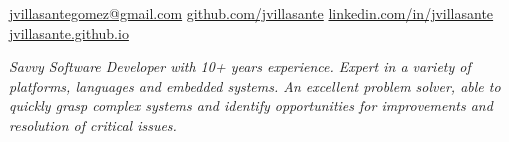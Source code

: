 \documentclass[10pt,a4paper]{article}
\begin{document}
\sloppy  %


\nobreakvspace{0.3em}  %

\noindent\href{mailto:jvillasantegomez.at.gmail.dot.com}{jvillasantegomez\mbox{}@\mbox{}gmail.com}\sbull
\noindent\href{https://github.com/jvillasante}{github.com/jvillasante}\sbull
\noindent\href{https://linkedin.com/in/jvillasante}{linkedin.com/in/jvillasante}\sbull
\noindent\href{https://jvillasante.github.io}{jvillasante.github.io}
\\

\emph{Savvy Software Developer with 10+ years experience. Expert in a variety of platforms, languages and embedded systems. An excellent problem solver, able to quickly grasp complex systems and identify opportunities for improvements and resolution of critical issues.}
\\

\spacedhrule{0em}{-0.4em}

\end{document}
